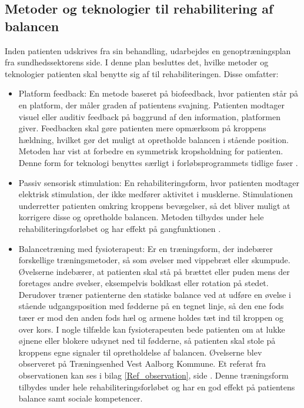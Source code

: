 \subsection{Metoder og teknologier til rehabilitering af balancen}
Inden patienten udskrives fra sin behandling, udarbejdes en genoptræningsplan fra sundhedssektorens side. I denne plan besluttes det, hvilke metoder og teknologier patienten skal benytte sig af til rehabiliteringen. Disse omfatter: \cite{Sundhedsstyrelsen2011a}  

\begin{itemize} \label{rehabiliteringbalance}
\item Platform feedback: En metode baseret på biofeedback, hvor patienten står på en platform, der måler graden af patientens svajning. Patienten modtager visuel eller auditiv feedback på baggrund af den information, platformen giver. Feedbacken skal gøre patienten mere opmærksom på kroppens hældning, hvilket gør det muligt at opretholde balancen i stående position. Metoden har vist at forbedre en symmetrisk kropsholdning for patienten. \cite{Barclay-Goddard2004} Denne form for teknologi benyttes særligt i forløbsprogrammets tidlige faser \cite{Sundhedsstyrelsen2011a}.
\item Passiv sensorisk stimulation: En rehabiliteringsform, hvor patienten modtager elektrisk stimulation, der ikke medfører aktivitet i musklerne. Stimulationen underretter patienten omkring kroppens bevægelser, så det bliver muligt at korrigere disse og opretholde balancen. \cite{Sundhedsstyrelsen2010} Metoden tilbydes under hele rehabiliteringsforløbet og har effekt på gangfunktionen \cite{Sundhedsstyrelsen2011a}.
\item Balancetræning med fysioterapeut: Er en træningsform, der indebærer forskellige træningsmetoder, så som øvelser med vippebræt eller skumpude. Øvelserne indebærer, at patienten skal stå på brættet eller puden mens der foretages andre øvelser, eksempelvis boldkast eller rotation på stedet. Derudover træner patienterne den statiske balance ved at udføre en øvelse i stående udgangsposition med fødderne på en tegnet linje, så den ene fods tæer er mod den anden fods hæl og armene holdes tæt ind til kroppen og over kors. I nogle tilfælde kan fysioterapeuten bede patienten om at lukke øjnene eller blokere udsynet ned til fødderne, så patienten skal stole på kroppens egne signaler til opretholdelse af balancen. \cite{Joergensen2004} Øvelserne blev observeret på Træningsenhed Vest Aalborg Kommune. Et referat fra observationen kan ses i bilag \ref{Ref_observation}, side \pageref{Ref_observation}. Denne træningsform tilbydes under hele rehabiliteringsforløbet og har en god effekt på patientens balance samt sociale kompetencer. \cite{Sundhedsstyrelsen2011a}

\end{itemize}
